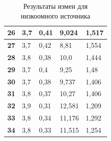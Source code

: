\documentclass[14pt, a4paper, twoside]{extreport}
\begin{document}
\begin{table}[H]
\begin{tabular}{|l|l|l|l|l|}
    \textbf{26} & 3,7 & 0,41 & 9,024  & 1,517 \\ \hline
    \textbf{27} & 3,7 & 0,42 & 8,81   & 1,554 \\ \hline
    \textbf{28} & 3,8 & 0,38 & 10,0   & 1,444 \\ \hline
    \textbf{29} & 3,7 & 0,4  & 9,25   & 1,48  \\ \hline
    \textbf{30} & 3,7 & 0,38 & 9,737  & 1,406 \\ \hline
    \textbf{31} & 3,8 & 0,37 & 10,27  & 1,406 \\ \hline
    \textbf{32} & 3,9 & 0,31 & 12,581 & 1,209 \\ \hline
    \textbf{33} & 3,8 & 0,34 & 11,176 & 1,292 \\ \hline
    \textbf{34} & 3,8 & 0,33 & 11,515 & 1,254 \\ \hline
  \end{tabular}
  \caption{Результаты измен для низкоомного источника}
  \label{tab:lowohms}
\end{table}
\end{document}

